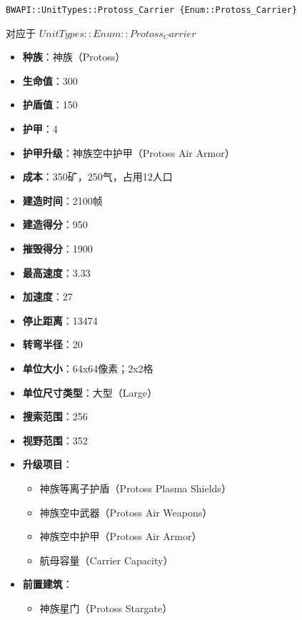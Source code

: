 \begin{tcolorbox}[colback=white, colframe=black!60!white, title=Protoss\_Carrier(), arc=0mm]
    \begin{verbatim}
BWAPI::UnitTypes::Protoss_Carrier {Enum::Protoss_Carrier}
    \end{verbatim}
    对应于  $ UnitTypes::Enum::Protoss_Carrier $ 
    \begin{itemize}
        \item \textbf{种族}：神族（Protoss）
        \item \textbf{生命值}：300
        \item \textbf{护盾值}：150
        \item \textbf{护甲}：4
        \item \textbf{护甲升级}：神族空中护甲（Protoss Air Armor）
        \item \textbf{成本}：350矿，250气，占用12人口
        \item \textbf{建造时间}：2100帧
        \item \textbf{建造得分}：950
        \item \textbf{摧毁得分}：1900
        \item \textbf{最高速度}：3.33
        \item \textbf{加速度}：27
        \item \textbf{停止距离}：13474
        \item \textbf{转弯半径}：20
        \item \textbf{单位大小}：64x64像素；2x2格
        \item \textbf{单位尺寸类型}：大型（Large）
        \item \textbf{搜索范围}：256
        \item \textbf{视野范围}：352
        \item \textbf{升级项目}：
            \begin{itemize}
                \item 神族等离子护盾（Protoss Plasma Shields）
                \item 神族空中武器（Protoss Air Weapons）
                \item 神族空中护甲（Protoss Air Armor）
                \item 航母容量（Carrier Capacity）
            \end{itemize}
        \item \textbf{前置建筑}：
            \begin{itemize}
                \item 神族星门（Protoss Stargate）

\end{itemize}
\end{itemize}
\end{tcolorbox}
